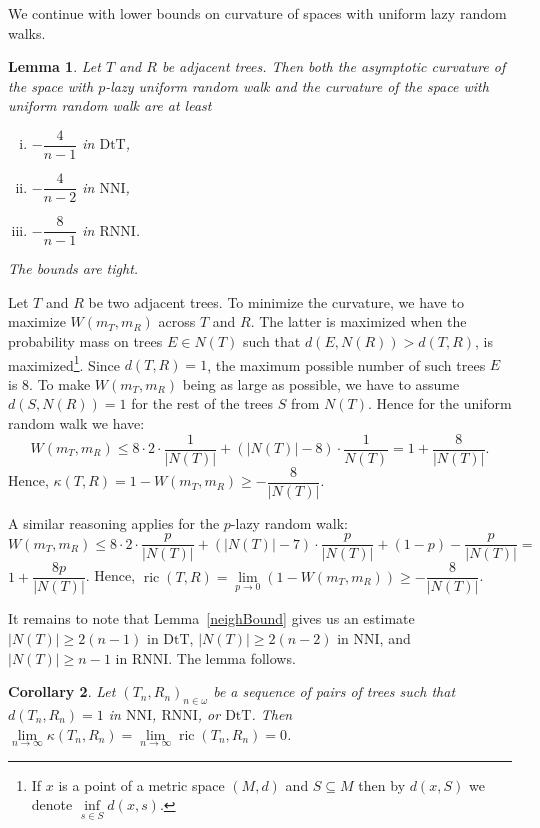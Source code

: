 \documentclass[11pt]{amsart}
\newtheorem{lemma}{Lemma}
\newtheorem{corollary}[lemma]{Corollary}
\theoremstyle{definition}
\newcommand{\nni}{\mathrm{NNI}}
\newcommand{\rnni}{\mathrm{RNNI}}
\newcommand{\dtt}{\mathrm{DtT}}
\newcommand{\ric}{\operatorname{ric}}
\begin{document}
{We continue with lower bounds on curvature of spaces with uniform lazy random walks.

\begin{lemma}
\label{uniformLower}
Let $T$ and $R$ be adjacent trees.
Then both the asymptotic curvature of the space with $p$-lazy uniform random walk and the curvature of the space with uniform random walk are at least
\begin{enumerate}[(i)]
\item $-\dfrac{4}{n-1}$ in $\dtt$,
\item $-\dfrac{4}{n-2}$ in $\nni$,
\item $-\dfrac{8}{n-1}$ in $\rnni$.
\end{enumerate}

The bounds are tight.
\end{lemma}

\proof
Let $T$ and $R$ be two adjacent trees.
To minimize the curvature, we have to maximize $W(m_T, m_R)$ across $T$ and $R$.
The latter is maximized when the probability mass on trees $E\in N(T)$ such that $d(E, N(R)) > d(T, R)$, is
maximized\footnote{If $x$ is a point of a metric space $(M,d)$ and $S \subseteq M$ then by $d(x,S)$ we denote $\inf\limits_{s \in S} d(x,s)$.}.
Since $d(T, R) = 1$, the maximum possible number of such trees $E$ is
$8$.
To make $W(m_T,m_R)$ being as large as possible, we have to assume $d(S, N(R)) = 1$ for the rest of the trees $S$ from $N(T)$.
Hence for the uniform random walk we have:
\[
W(m_T,m_R)\leq 8 \cdot 2 \cdot \frac{1}{|N(T)|} +
(|N(T)| - 8) \cdot \frac{1}{N(T)} = 1 + \dfrac{8}{|N(T)|}.
\]
Hence, $\kappa(T,R) = 1 - W(m_T,m_R) \geq - \dfrac{8}{|N(T)|}$.

A similar reasoning applies for the $p$-lazy random walk:
\[
W(m_T,m_R)\leq 8 \cdot 2 \cdot \frac{p}{|N(T)|} +
(|N(T)| - 7) \cdot \frac{p}{|N(T)|} + (1-p) - \frac{p}{|N(T)|} =
\]
$1 + \dfrac{8p}{|N(T)|}$.
Hence, $\ric(T,R) = \lim\limits_{p\to0}\left(1 - W(m_T,m_R)\right) \geq - \dfrac{8}{|N(T)|}$.

It remains to note that Lemma~\ref{neighBound} gives us an estimate $|N(T)| \geq 2(n-1)$ in $\dtt$, $|N(T)| \geq 2(n-2)$ in $\nni$, and $|N(T)| \geq n-1$ in $\rnni$.
The lemma follows.
\endproof

\begin{corollary}
\label{flatInLimDTS}
Let $(T_n,R_n)_{n\in\omega}$ be a sequence of pairs of trees such that $d(T_n,R_n) = 1$ in $\nni$, $\rnni$, or $\dtt$.
Then $\lim\limits_{n \to \infty}\kappa(T_n,R_n) = \lim\limits_{n \to \infty}\ric(T_n,R_n) = 0$.
\end{corollary}

}
\end{document}
